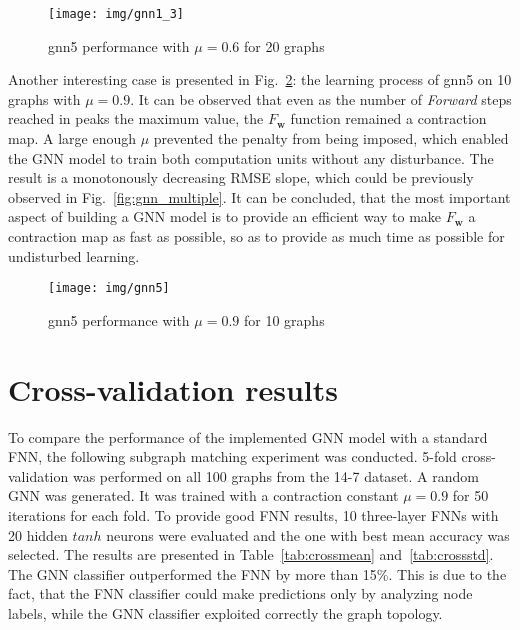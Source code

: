 \begin{figure}[h!]
\begin{center}
	\texttt{[image: img/gnn1\_3]}
	\caption{gnn5 performance with $\mu = 0.6$ for 20 graphs}
	\label{fig:gnn5_06}
\end{center}
\end{figure}

\newpage
Another interesting case is presented in Fig.~\ref{fig:gnn5_09_10}: the learning process of gnn5 on 10 graphs with $\mu = 0.9$. It can be observed that even as the number of \emph{Forward} steps reached in peaks the maximum value, the $F_{\bm{w}}$ function remained a contraction map. A large enough $\mu$ prevented the penalty from being imposed, which enabled the GNN model to train both computation units without any disturbance. The result is a monotonously decreasing RMSE slope, which could be previously observed in Fig.~\ref{fig:gnn_multiple}. It can be concluded, that the most important aspect of building a GNN model is to provide an efficient way to make $F_{\bm{w}}$ a contraction map as fast as possible, so as to provide as much time as possible for undisturbed learning.

\newpage
\begin{figure}[h!]
\begin{center}
	\texttt{[image: img/gnn5]}
	\caption{gnn5 performance with $\mu = 0.9$ for 10 graphs}
	\label{fig:gnn5_09_10}
\end{center}
\end{figure}

\newpage
\section{Cross-validation results}
To compare the performance of the implemented GNN model with a standard FNN, the following subgraph matching experiment was conducted. 5-fold cross-validation was performed on all 100 graphs from the 14-7 dataset. A random GNN was generated. It was trained with a contraction constant $\mu = 0.9$ for 50 iterations for each fold. To provide good FNN results, 10 three-layer FNNs with 20 hidden $tanh$ neurons were evaluated and the one with best mean accuracy was selected. The results are presented in Table~\ref{tab:crossmean} and~\ref{tab:crossstd}. The GNN classifier outperformed the FNN by more than 15\%. This is due to the fact, that the FNN classifier could make predictions only by analyzing node labels, while the GNN classifier exploited correctly the graph topology.

